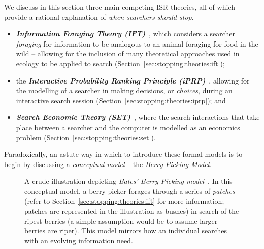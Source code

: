 We discuss in this section three main competing ISR theories, all of which provide a rational explanation of \emph{when searchers should stop}.

\begin{itemize}
    \item{\textbf{\emph{Information Foraging Theory (IFT)}}~\citep{pirolli1999ift}, which considers a searcher \emph{foraging} for information to be analogous to an animal foraging for food in the wild -- allowing for the inclusion of many theoretical approaches used in ecology to be applied to search (Section~\ref{sec:stopping:theories:ift});}
    
    \item{the \textbf{\emph{Interactive Probability Ranking Principle (iPRP)}}~\citep{fuhr2008iprp}, allowing for the modelling of a searcher in making decisions, or \emph{choices}, during an interactive search session (Section~\ref{sec:stopping:theories:iprp}); and}
    
    \item{\textbf{\emph{Search Economic Theory (SET)}}~\citep{azzopardi2011economics}, where the search interactions that take place between a searcher and the computer is modelled as an economics problem (Section~\ref{sec:stopping:theories:set}).}
\end{itemize}

Paradoxically, an astute way in which to introduce these formal models is to begin by discussing a \emph{conceptual model} -- the \emph{Berry Picking Model}.

\begin{figure}[t!]
    \centering
    \caption[Berry Picking]{A crude illustration depicting \emph{Bates' Berry Picking model}~\citep{bates1989berry_picking}. In this conceptual model, a berry picker forages through a series of \emph{patches} (refer to Section~\ref{sec:stopping:theories:ift} for more information; patches are represented in the illustration as bushes) in search of the ripest berries (a simple assumption would be to assume larger berries are riper). This model mirrors how an individual searches with an evolving information need.}
    \label{fig:ch3-berry_picking}
\end{figure}

